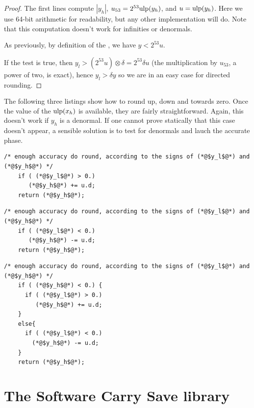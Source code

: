 \begin{proof}
  The first lines compute $|y_h|$, $u_{53}=2^{53}\mbox{ulp}(y_h)$, and
  $u=\mbox{ulp}(y_h)$. Here we use 64-bit arithmetic for readability, but
  any other implementation will do. Note that this computation doesn't
  work for infinities or denormals.
  
  As previously, by definition of the \ulp, we have  $y<2^{53}u$.
  
  If the test is true, then $y_l>(2^{53}u)\otimes \delta = 
  2^{53} \delta u $ (the multiplication by $u_{53}$, a power of
  two, is exact), hence $y_l>\delta y$ so we are in an easy case for directed rounding.

\end{proof}


The following three listings show how to round up, down and towards
zero. Once the value of the $\mbox{ulp}(x_h)$ is available, they are fairly
straightforward. Again, this doesn't work if $y_h$ is a denormal. If
one cannot prove statically that this case doesn't appear, a sensible solution
is to test for denormals and lauch the accurate phase.


\begin{lstlisting}[caption={Rounding up},
  firstnumber=1]    /* enough accuracy do round, according to the signs of (*@$y_l$@*) and (*@$y_h$@*) */
    if ( (*@$y_l$@*) > 0.)
       (*@$y_h$@*) += u.d;
    return (*@$y_h$@*);
\end{lstlisting}

\begin{lstlisting}[caption={Rounding down},
  firstnumber=1]    /* enough accuracy do round, according to the signs of (*@$y_l$@*) and (*@$y_h$@*) */
    if ( (*@$y_l$@*) < 0.)
       (*@$y_h$@*) -= u.d;
    return (*@$y_h$@*);
\end{lstlisting}


\begin{lstlisting}[caption={Rounding towards zero},
  firstnumber=1]    /* enough accuracy do round, according to the signs of (*@$y_l$@*) and (*@$y_h$@*) */
    if ( (*@$y_h$@*) < 0.) {
      if ( (*@$y_l$@*) > 0.)
         (*@$y_h$@*) += u.d;
    }
    else{
      if ( (*@$y_l$@*) < 0.)
        (*@$y_h$@*) -= u.d;
    }
    return (*@$y_h$@*);
\end{lstlisting}








\section{The Software Carry Save library}

